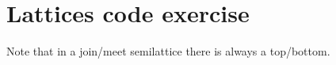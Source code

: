 \section{Lattices code exercise}





Note that in a join/meet semilattice there is always a top/bottom.
